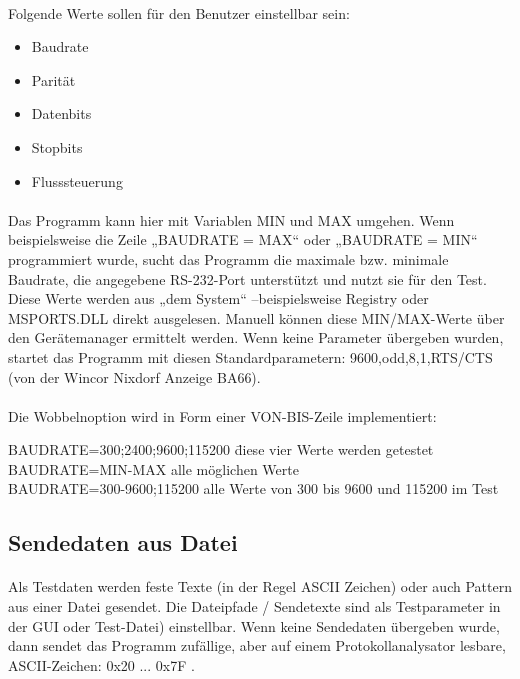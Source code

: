 \paragraph{}
Folgende Werte sollen für den Benutzer einstellbar sein:

\begin{itemize}
\item Baudrate
\item Parität
\item Datenbits
\item Stopbits
\item Flusssteuerung
\end{itemize}
\paragraph{}
Das Programm kann hier mit Variablen MIN und MAX umgehen. Wenn beispielsweise die Zeile „BAUDRATE = MAX“ oder „BAUDRATE = MIN“  programmiert wurde,  sucht das Programm die maximale bzw. minimale Baudrate, die angegebene RS-232-Port unterstützt und nutzt sie für den Test. Diese Werte werden aus „dem System“ –beispielsweise Registry oder  MSPORTS.DLL direkt ausgelesen. Manuell können diese MIN/MAX-Werte über den Gerätemanager ermittelt werden. Wenn keine Parameter übergeben wurden, startet das Programm mit diesen Standardparametern: 9600,odd,8,1,RTS/CTS (von der Wincor Nixdorf Anzeige BA66).

\paragraph{}
Die Wobbelnoption wird in Form einer VON-BIS-Zeile implementiert:

\begin{tabbing}
\hspace*{10mm} BAUDRATE=300;2400;9600;115200 \= diese vier Werte werden getestet
\\
\hspace*{10mm} BAUDRATE=MIN-MAX \>alle möglichen Werte
\\
\hspace*{10mm} BAUDRATE=300-9600;115200 \>alle Werte von 300 bis 9600 und 115200 im Test
\end{tabbing}


\subsection{Sendedaten aus Datei}
\paragraph{}
Als Testdaten werden feste Texte (in der Regel ASCII Zeichen) oder auch Pattern aus einer Datei gesendet. Die Dateipfade / Sendetexte sind als Testparameter in der GUI oder Test-Datei) einstellbar. Wenn keine Sendedaten übergeben wurde, dann sendet das Programm zufällige, aber auf einem Protokollanalysator lesbare, ASCII-Zeichen: 0x20 ... 0x7F .


